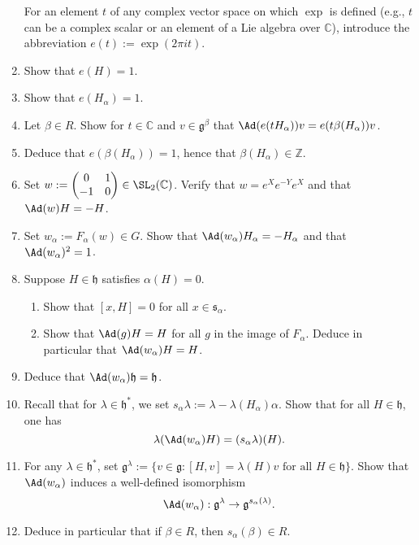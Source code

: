 \documentclass[reqno]{amsart} 
\begin{document}
\begin{homework}
\begin{enumerate}
    For an element $t$ of any complex vector space on which $\exp$ is defined
    (e.g., $t$ can be a complex scalar
    or an element of a Lie algebra over $\mathbb{C}$),
    introduce the abbreviation $e(t) := \exp(2 \pi i t)$.
  \item
    Show that $e(H) = 1$.
  \item
    Show that $e(H_\alpha) = 1$.
  \item
    Let $\beta \in R$.
    Show for $t \in \mathbb{C}$
    and $v \in \mathfrak{g}^\beta$
    that $\Ad(e(t H_\alpha)) v = e(t \beta(H_\alpha)) v$.
  \item Deduce that $e(\beta(H_\alpha)) = 1$, hence that
    $\beta(H_\alpha) \in \mathbb{Z}$.
  \item Set $w := 
\begin{pmatrix}
      0 & 1 \\
      -1 & 0
    \end{pmatrix}
 \in \SL_2(\mathbb{C})$.
    Verify that $w = e^X e^{-Y} e^X$
    and that $\Ad(w) H = - H$.
  \item Set $w_\alpha := F_\alpha(w) \in G$.
    Show that $\Ad(w_\alpha) H_\alpha = - H_\alpha$
    and that $\Ad(w_\alpha)^2 = 1$.
  \item Suppose $H \in \mathfrak{h}$ satisfies
    $\alpha(H) = 0$.
    \begin{enumerate}
    \item Show that $[x,H] = 0$ for all $x \in
      \mathfrak{s}_\alpha$.
    \item Show that $\Ad(g) H = H$ for all $g$ in the image of
      $F_\alpha$.
      Deduce in particular that $\Ad(w_\alpha) H = H$.
    \end{enumerate}
  \item
    Deduce that $\Ad(w_\alpha) \mathfrak{h} = \mathfrak{h}$.
  \item
    Recall that for $\lambda \in \mathfrak{h}^*$,
    we set $s_\alpha \lambda := \lambda - \lambda(H_\alpha)
    \alpha$.
    Show that for all $H \in \mathfrak{h}$,
    one has
    \begin{equation}
      \lambda(\Ad(w_\alpha) H) = (s_\alpha \lambda)(H).
    \end{equation}
  \item
    For any $\lambda \in \mathfrak{h}^*$,
    set
    $\mathfrak{g}^\lambda := \{v \in \mathfrak{g} : [H,v] =
    \lambda(H) v \text{ for all } H \in \mathfrak{h}\}$.
    Show that
    $\Ad(w_\alpha)$ induces a well-defined isomorphism
    \begin{equation}
      \Ad(w_\alpha) : \mathfrak{g}^{\lambda} \rightarrow \mathfrak{g}^{s_\alpha(\lambda)}.
    \end{equation}
  \item Deduce in particular
    that if $\beta \in R$, then $s_\alpha(\beta) \in R$.
  \end{enumerate}
\end{homework}
\end{document}
